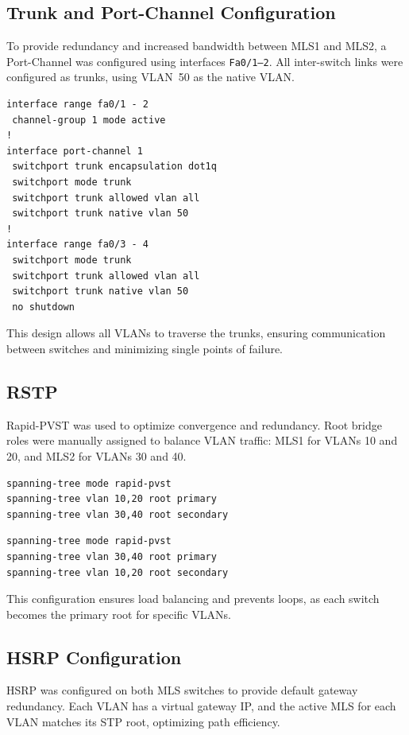 \subsection{Trunk and Port-Channel Configuration}
To provide redundancy and increased bandwidth between MLS1 and MLS2, a Port-Channel was configured using interfaces \texttt{Fa0/1–2}.  
All inter-switch links were configured as trunks, using \ac{VLAN}~50 as the native \ac{VLAN}.

\begin{lstlisting}[caption={Trunk and Port-Channel configuration on MLS1 and MLS2}, label={lst:mls1-portchannel}]
interface range fa0/1 - 2
 channel-group 1 mode active
!
interface port-channel 1
 switchport trunk encapsulation dot1q
 switchport mode trunk
 switchport trunk allowed vlan all
 switchport trunk native vlan 50
!
interface range fa0/3 - 4
 switchport mode trunk
 switchport trunk allowed vlan all
 switchport trunk native vlan 50
 no shutdown
\end{lstlisting}

This design allows all \ac{VLAN}s to traverse the trunks, ensuring communication between switches and minimizing single points of failure.

\subsection{\ac{RSTP}}
Rapid-PVST was used to optimize convergence and redundancy.  
Root bridge roles were manually assigned to balance \ac{VLAN} traffic: MLS1 for \ac{VLAN}s 10 and 20, and MLS2 for \ac{VLAN}s 30 and 40.

\begin{lstlisting}[caption={RSTP configuration on MLS1}, label={lst:rstp-mls1}]
spanning-tree mode rapid-pvst
spanning-tree vlan 10,20 root primary
spanning-tree vlan 30,40 root secondary
\end{lstlisting}

\begin{lstlisting}[caption={RSTP configuration on MLS2}, label={lst:rstp-mls2}]
spanning-tree mode rapid-pvst
spanning-tree vlan 30,40 root primary
spanning-tree vlan 10,20 root secondary
\end{lstlisting}

This configuration ensures load balancing and prevents loops, as each switch becomes the primary root for specific \ac{VLAN}s.

\subsection{\ac{HSRP} Configuration}
\ac{HSRP} was configured on both MLS switches to provide default gateway redundancy.  
Each \ac{VLAN} has a virtual gateway IP, and the active MLS for each \ac{VLAN} matches its \ac{STP} root, optimizing path efficiency.

